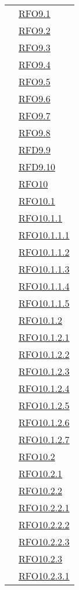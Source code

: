 \begin{longtable}{|>{\centering}m{5cm}|m{5cm}<{\centering}|}
& \hyperlink{RFO9.1}{RFO9.1}\\
& \hyperlink{RFO9.2}{RFO9.2}\\
& \hyperlink{RFO9.3}{RFO9.3}\\
& \hyperlink{RFO9.4}{RFO9.4}\\
& \hyperlink{RFO9.5}{RFO9.5}\\
& \hyperlink{RFO9.6}{RFO9.6}\\
& \hyperlink{RFO9.7}{RFO9.7}\\
& \hyperlink{RFO9.8}{RFO9.8}\\
& \hyperlink{RFD9.9}{RFD9.9}\\
& \hyperlink{RFD9.10}{RFD9.10}\\
& \hyperlink{RFO10}{RFO10}\\
& \hyperlink{RFO10.1}{RFO10.1}\\
& \hyperlink{RFO10.1.1}{RFO10.1.1}\\
& \hyperlink{RFO10.1.1.1}{RFO10.1.1.1}\\
& \hyperlink{RFO10.1.1.2}{RFO10.1.1.2}\\
& \hyperlink{RFO10.1.1.3}{RFO10.1.1.3}\\
& \hyperlink{RFO10.1.1.4}{RFO10.1.1.4}\\
& \hyperlink{RFO10.1.1.5}{RFO10.1.1.5}\\
& \hyperlink{RFO10.1.2}{RFO10.1.2}\\
& \hyperlink{RFO10.1.2.1}{RFO10.1.2.1}\\
& \hyperlink{RFO10.1.2.2}{RFO10.1.2.2}\\
& \hyperlink{RFO10.1.2.3}{RFO10.1.2.3}\\
& \hyperlink{RFO10.1.2.4}{RFO10.1.2.4}\\
& \hyperlink{RFO10.1.2.5}{RFO10.1.2.5}\\
& \hyperlink{RFO10.1.2.6}{RFO10.1.2.6}\\
& \hyperlink{RFO10.1.2.7}{RFO10.1.2.7}\\
& \hyperlink{RFO10.2}{RFO10.2}\\
& \hyperlink{RFO10.2.1}{RFO10.2.1}\\
& \hyperlink{RFO10.2.2}{RFO10.2.2}\\
& \hyperlink{RFO10.2.2.1}{RFO10.2.2.1}\\
& \hyperlink{RFO10.2.2.2}{RFO10.2.2.2}\\
& \hyperlink{RFO10.2.2.3}{RFO10.2.2.3}\\
& \hyperlink{RFO10.2.3}{RFO10.2.3}\\
& \hyperlink{RFO10.2.3.1}{RFO10.2.3.1}\\

\end{longtable}
